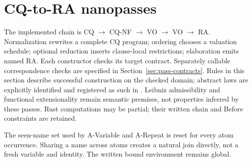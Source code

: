 \section{CQ-to-RA nanopasses}
\label{sec:planning}
The implemented chain is CQ $\to$ CQ-NF $\to$ VO $\to$ VO $\to$ RA.
Normalization rewrites a complete CQ program; ordering chooses a valuation
schedule; optional reduction inserts clause-local restrictions; elaboration
emits named RA. Each constructor checks its target contract. Separately callable
correspondence checks are specified in Section~\ref{sec:pass-contracts}.
Rules in this section describe successful construction on the checked domain;
abstract laws are explicitly identified and registered as such in
. Leibniz admissibility and functional extensionality remain
semantic premises, not properties inferred by these passes. Rust computations
may be partial; their written chain and Before constraints are retained.

The seen-name set used by A-Variable and A-Repeat is reset for every atom
occurrence. Sharing a name across atoms creates a natural join directly, not
a fresh variable and identity. The written bound environment remains global.

